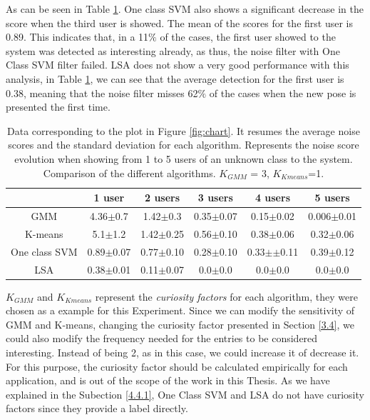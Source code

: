 As can be seen in Table \ref{tab:int}. One class SVM  also shows a significant decrease in the score when the third user is showed. The mean of the scores for the first user is 0.89. This indicates that, in a 11$\%$ of the cases, the first user showed to the system was detected as interesting already, as thus, the noise filter with One Class SVM filter failed. LSA does not show a very good performance with this analysis, in Table \ref{tab:int}, we can see that the average detection for the first user is 0.38, meaning that the noise filter misses 62$\%$ of the cases when the new pose is presented the first time. 

\begin{table}[!ht]
	\footnotesize
	\renewcommand{\arraystretch}{2}
	\begin{tabular}{cccccc}
	\hline 
	 & 1 user    &  2 users &  3 users & 4 users    &  5 users \\
	\hline
	GMM  & 4.36$\pm$0.7  & 1.42$\pm$0.3 & 0.35$\pm$0.07 & 0.15$\pm$0.02 & 0.006$\pm$0.01\\
	K-means  & 5.1$\pm$1.2 & 1.42$\pm$0.25 & 0.56$\pm$0.10 & 0.38$\pm$0.06 & 0.32$\pm$0.06    \\
	One class SVM  & 0.89$\pm$0.07 & 0.77$\pm$0.10 & 0.28$\pm$0.10 & 0.33$\pm$$\pm$0.11 & 0.39$\pm$0.12  \\
	LSA   & 0.38$\pm$0.01 & 0.11$\pm$0.07 & 0.0$\pm$0.0& 0.0$\pm$0.0& 0.0$\pm$0.0   \\
	\hline
	\end{tabular}
	\centering
	\caption[Data corresponding to the graph in Figure \ref{fig:chart}]{Data corresponding to the plot in Figure \ref{fig:chart}. It resumes the average noise scores and the standard deviation for each algorithm. Represents the noise score evolution when showing from 1 to 5 users of an unknown class to the system. Comparison of the different algorithms. $ K_{GMM} $ = 3, $ K_{Kmeans} $=1. \label{tab:int}}
\end{table}

$ K_{GMM} $ and $ K_{Kmeans} $ represent the \emph{curiosity factors} for each algorithm, they were chosen as a example for this Experiment. Since we can modify the sensitivity of GMM and K-means, changing the curiosity factor presented in Section \ref{3.4}, we could also modify the frequency needed for the entries to be considered interesting. Instead of being 2, as in this case,  we could increase it of decrease it. For this purpose, the curiosity factor should be calculated empirically for each application, and is out of the scope of the work in this Thesis. As we have explained in the Subection \ref{4.4.1}, One Class SVM and LSA do not have curiosity factors since they provide a label directly.

